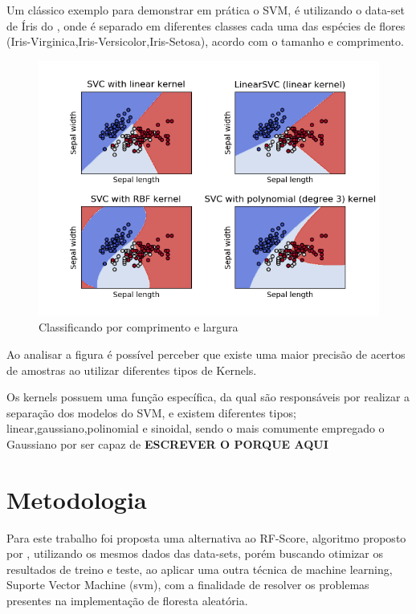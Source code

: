 \documentclass[tcc, capa]{texucpel}
\begin{document}
Um clássico exemplo para demonstrar em prática o SVM, é utilizando o data-set de Íris do \cite{fisher1936use}, onde é separado em diferentes classes cada uma das espécies de flores (Iris-Virginica,Iris-Versicolor,Iris-Setosa), acordo com o tamanho e comprimento. 

    \begin{figure}[!htb]
	\centering\includegraphics[width=15cm]{imagens/exemplo_svm.png}
	\caption{Classificando por comprimento e largura}
	\end{figure}

Ao analisar a figura é possível perceber que existe uma maior precisão de acertos de amostras ao utilizar diferentes tipos de Kernels.

Os kernels possuem uma função específica, da qual são responsáveis por realizar a separação dos modelos do SVM, e existem diferentes tipos; linear,gaussiano,polinomial e sinoidal, sendo o mais comumente empregado o Gaussiano por ser capaz de \textbf{ESCREVER O PORQUE AQUI}

\chapter{Metodologia}
Para este trabalho foi proposta uma alternativa ao RF-Score, algoritmo proposto por \cite{ballester2010machine}, utilizando os mesmos dados das data-sets, porém buscando otimizar os resultados  de treino e teste, ao aplicar uma outra técnica de machine learning, Suporte Vector Machine (svm), com a finalidade de resolver os problemas presentes na implementação de floresta aleatória.
\end{document}

